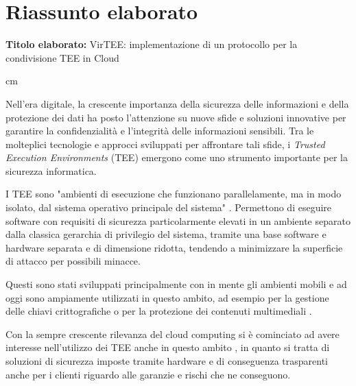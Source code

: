 \documentclass[12pt,italian]{report}
\begin{document}
	
	\chapter*{Riassunto elaborato}
	
	
	\textbf{Titolo elaborato:} VirTEE: implementazione di un protocollo per la condivisione TEE in Cloud
	
	 cm
	
	Nell'era digitale, la crescente importanza della sicurezza delle informazioni e della protezione dei dati ha posto l'attenzione su nuove sfide e soluzioni innovative per garantire la confidenzialità e l'integrità delle informazioni sensibili. Tra le molteplici tecnologie e approcci sviluppati per affrontare tali sfide, i \textit{Trusted Execution Environments} (TEE) emergono come uno strumento importante per la sicurezza informatica.
	
	I TEE sono "ambienti di esecuzione che funzionano parallelamente, ma in modo isolato, dal sistema operativo principale del sistema" \cite{gp2020systemarchitecture}. Permettono di eseguire software con requisiti di sicurezza particolarmente elevati in un ambiente separato dalla classica gerarchia di privilegio del sistema, tramite una base software e hardware separata e di dimensione ridotta, tendendo a minimizzare la superficie di attacco per possibili minacce.
	
	\medbreak
	
	Questi sono stati sviluppati principalmente con in mente gli ambienti mobili e ad oggi sono ampiamente utilizzati in questo ambito, ad esempio per la gestione delle chiavi crittografiche \cite{androidkeystore} o per la protezione dei contenuti multimediali \cite{widevine} \cite{playready}.
	
	Con la sempre crescente rilevanza del cloud computing si è cominciato ad avere interesse nell'utilizzo dei TEE anche in questo ambito \cite{demigha2021hardware} \cite{dai2010tee}, in quanto si tratta di soluzioni di sicurezza imposte tramite hardware e di conseguenza trasparenti anche per i clienti riguardo alle garanzie e rischi che ne conseguono.
	
\end{document}
